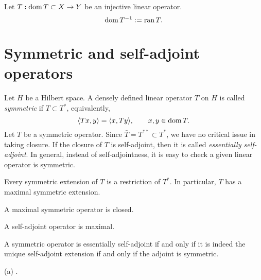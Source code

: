 \documentclass{../../large}
\begin{document}
\begin{prb}
\end{prb}

\begin{prb}
\end{prb}

\begin{prb}
Let $T:\operatorname{dom} T\subset X\to Y$ be an injective linear operator.
\[\operatorname{dom} T^{-1}:=\operatorname{ran} T.\]
\end{prb}



\section{Symmetric and self-adjoint operators}


\begin{prb}
Let $H$ be a Hilbert space.
A densely defined linear operator $T$ on $H$ is called \emph{symmetric} if $T\subset T^*$, equivalently,
\[\langle Tx,y\rangle=\langle x,Ty\rangle,\qquad x,y\in\operatorname{dom} T.\]
Let $T$ be a symmetric operator.
Since $\bar T=T^{**}\subset T^*$, we have no critical issue in taking closure.
If the closure of $T$ is self-adjoint, then it is called \emph{essentially self-adjoint}.
In general, instead of self-adjointness, it is easy to check a given linear operator is symmetric.
\begin{parts}
\item Every symmetric extension of $T$ is a restriction of $T^*$. In particular, $T$ has a maximal symmetric extension.
\item A maximal symmetric operator is closed.
\item A self-adjoint operator is maximal.
\item A symmetric operator is essentially self-adjoint if and only if it is indeed the unique self-adjoint extension if and only if the adjoint is symmetric.
\end{parts}
\end{prb}
\begin{pf}
(a) .
\end{pf}
\end{document}
